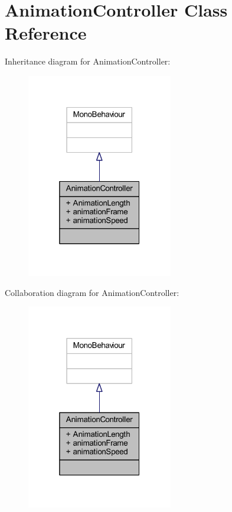 \hypertarget{class_animation_controller}{}\section{Animation\+Controller Class Reference}
\label{class_animation_controller}


Inheritance diagram for Animation\+Controller\+:
\nopagebreak
\begin{figure}[H]
\begin{center}
\leavevmode
\includegraphics[width=181pt]{class_animation_controller__inherit__graph}
\end{center}
\end{figure}


Collaboration diagram for Animation\+Controller\+:
\nopagebreak
\begin{figure}[H]
\begin{center}
\leavevmode
\includegraphics[width=181pt]{class_animation_controller__coll__graph}
\end{center}
\end{figure}
